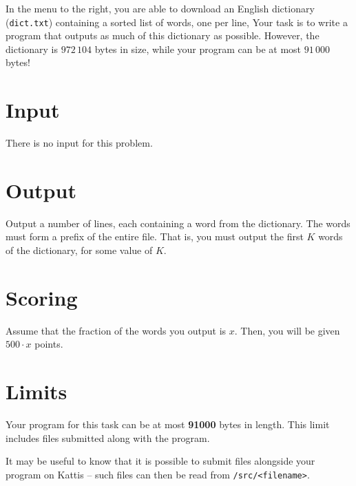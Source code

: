 In the menu to the right, you are able to download an English dictionary (\texttt{dict.txt}) containing a sorted list of words, one per line,
Your task is to write a program that outputs as much of this dictionary as possible.
However, the dictionary is $972\,104$ bytes in size, while your program can be at most $91\,000$ bytes!

\section*{Input}
There is no input for this problem.

\section*{Output}
Output a number of lines, each containing a word from the dictionary.
The words must form a prefix of the entire file.
That is, you must output the first $K$ words of the dictionary, for some value of $K$.

\section*{Scoring}
Assume that the fraction of the words you output is $x$. Then, you will be given $500 \cdot x$ points.

\section*{Limits}
Your program for this task can be at most \textbf{91000} bytes in length.
This limit includes files submitted along with the program.

It may be useful to know that it is possible to submit files alongside your program on Kattis --
such files can then be read from \texttt{/src/<filename>}.
